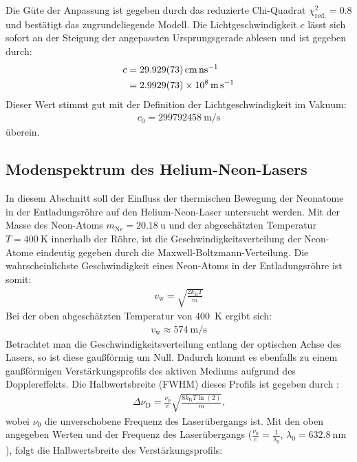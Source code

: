 \documentclass[11pt, a4paper]{article}
\numberwithin{equation}{section}
\begin{document}
Die Güte der Anpassung ist gegeben durch das reduzierte Chi-Quadrat $\chi_\mathrm{red.}^2 = \num{0.8}$ und bestätigt das zugrundeliegende Modell.
Die Lichtgeschwindigkeit $c$ lässt sich sofort an der Steigung der angepassten Ursprungsgerade ablesen und ist gegeben durch:
\begin{align}
	c &= \SI{29.929 +- 0.073}{\centi\metre\per\nano\second} \nonumber\\
	&= \SI{2.9929 +- 0.0073 e8}{\metre\per\second}
\end{align}
Dieser Wert stimmt gut mit der Definition der Lichtgeschwindigkeit im Vakuum:
\begin{align}
	c_0 = \SI{299792458}{\metre\per\second}
\end{align}
überein.

\subsection{Modenspektrum des Helium-Neon-Lasers}
In diesem Abschnitt soll der Einfluss der thermischen Bewegung der Neonatome in der Entladungsröhre auf den Helium-Neon-Laser untersucht werden.
Mit der Masse des Neon-Atoms $m_\mathrm{Ne} = \SI{20.18}{\atomicmassunit}$ \cite{iupac_periodic_table} und der abgeschätzten Temperatur $T = \SI{400}{\kelvin}$ innerhalb der Röhre, ist die Geschwindigkeitsverteilung der Neon-Atome eindeutig gegeben durch die Maxwell-Boltzmann-Verteilung.
Die wahrscheinlichste Geschwindigkeit eines Neon-Atoms in der Entladungsröhre ist somit:
\begin{align}
	v_\mathrm{w} = \sqrt{\frac{2 k_\mathrm{B} T}{m}}
\end{align}
Bei der oben abgeschätzten Temperatur von \SI{400}{\kelvin} ergibt sich:
\begin{align}
	v_\mathrm{w} \approx \SI{574}{\metre\per\second}
\end{align}
Betrachtet man die Geschwindigkeitsverteilung entlang der optischen Achse des Lasers, so ist diese gaußförmig um Null.
Dadurch kommt es ebenfalls zu einem gaußförmigen Verstärkungsprofils des aktiven Mediums aufgrund des Dopplereffekts.
Die Halbwertsbreite (FWHM) dieses Profils ist gegeben durch \cite{meschede}:
\begin{align}
	\Delta \nu_\mathrm{D} = \frac{\nu_0}{c} \sqrt{\frac{8 k_\mathrm{B} T \ln(2)}{m}} \text{,}
\end{align}
wobei $\nu_0$ die unverschobene Frequenz des Laserübergangs ist.
Mit den oben angegeben Werten und der Frequenz des Laserübergangs ($\frac{\nu_0}{c} = \frac{1}{\lambda_0}$, $\lambda_0 = \SI{632.8}{\nano\metre}$), folgt die Halbwertsbreite des Verstärkungsprofils:
\end{document}
